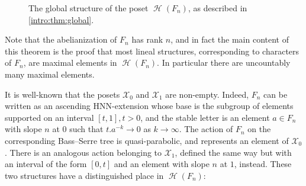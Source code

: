 \documentclass[reqno,12pt]{amsart}\setcounter{tocdepth}{1}
\theoremstyle{definition}
\DeclareMathOperator{\Hyp}{\mathcal{H}}
\newcommand{\X}{\mathcal{X}}
\numberwithin{equation}{section}
\begin{document}
\begin{figure}[htb]
\centering
{}
\caption{The global structure of the poset $\Hyp(F_n)$, as described in \cref{intro:thm:global}.}
\label{intro:fig:global}
\end{figure}

Note that the abelianization of $F_n$ has rank $n$, and in fact the main content of this theorem is the proof that most lineal structures, corresponding to characters of $F_n$, are maximal elements in $\Hyp(F_n)$. In particular there are uncountably many maximal elements.

\medskip

It is well-known that the posets $\X_0$ and $\X_1$ are non-empty. Indeed, $F_n$ can be written as an ascending HNN-extension whose base is the subgroup of elements supported on an interval $[t, 1], t > 0$, and the stable letter is an element $a \in F_n$ with slope $n$ at $0$ such that $t.a^{-k} \to 0$ as $k \to \infty$. The action of $F_n$ on the corresponding Bass--Serre tree is quasi-parabolic, and represents an element of $\X_0$. There is an analogous action belonging to $\X_1$, defined the same way but with an interval of the form $[0, t]$ and an element with slope $n$ at $1$, instead. These two structures have a distinguished place in $\Hyp(F_n)$:
\end{document}
